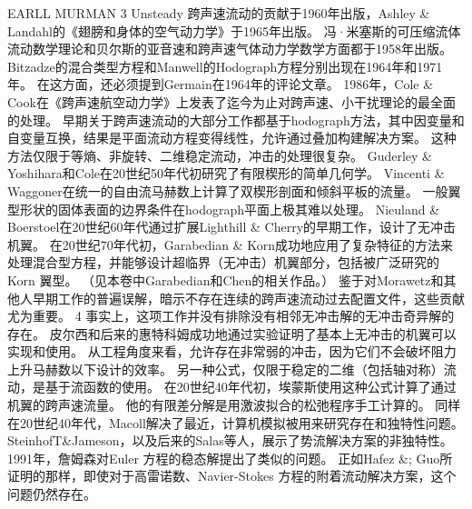 \documentclass[UTF8,11pt,a4paper,openany,fontset=fandol]{ctexbook}
\begin{document}
EARLL MURMAN 3 Unsteady 跨声速流动的贡献于1960年出版，Ashley \& Landahl的《翅膀和身体的空气动力学》于1965年出版。 冯·米塞斯的可压缩流体流动数学理论和贝尔斯的亚音速和跨声速气体动力学数学方面都于1958年出版。 Bitzadze的混合类型方程和Manwell的Hodograph方程分别出现在1964年和1971年。 在这方面，还必须提到Germain在1964年的评论文章。 1986年，Cole \& Cook在《跨声速航空动力学》上发表了迄今为止对跨声速、小干扰理论的最全面的处理。 早期关于跨声速流动的大部分工作都基于hodograph方法，其中因变量和自变量互换，结果是平面流动方程变得线性，允许通过叠加构建解决方案。 这种方法仅限于等熵、非旋转、二维稳定流动，冲击的处理很复杂。 Guderley \& Yoshihara和Cole在20世纪50年代初研究了有限楔形的简单几何学。 Vincenti \& Waggoner在统一的自由流马赫数上计算了双楔形剖面和倾斜平板的流量。 一般翼型形状的固体表面的边界条件在hodograph平面上极其难以处理。 Nieuland \& Boerstoel在20世纪60年代通过扩展Lighthill \& Cherry的早期工作，设计了无冲击机翼。 在20世纪70年代初，Garabedian \& Korn成功地应用了复杂特征的方法来处理混合型方程，并能够设计超临界（无冲击）机翼部分，包括被广泛研究的Korn 翼型。 （见本卷中Garabedian和Chen的相关作品。） 鉴于对Morawetz和其他人早期工作的普遍误解，暗示不存在连续的跨声速流动过去配置文件，这些贡献尤为重要。 4 事实上，这项工作并没有排除没有相邻无冲击解的无冲击奇异解的存在。 皮尔西和后来的惠特科姆成功地通过实验证明了基本上无冲击的机翼可以实现和使用。 从工程角度来看，允许存在非常弱的冲击，因为它们不会破坏阻力上升马赫数以下设计的效率。 另一种公式，仅限于稳定的二维（包括轴对称）流动，是基于流函数的使用。 在20世纪40年代初，埃蒙斯使用这种公式计算了通过机翼的跨声速流量。 他的有限差分解是用激波拟合的松弛程序手工计算的。 同样在20世纪40年代，Macoll解决了最近，计算机模拟被用来研究存在和独特性问题。 SteinhofT\&Jameson，以及后来的Salas等人，展示了势流解决方案的非独特性。 1991年，詹姆森对Euler 方程的稳态解提出了类似的问题。 正如Hafez \&; Guo所证明的那样，即使对于高雷诺数、Navier-Stokes 方程的附着流动解决方案，这个问题仍然存在。
\end{document}
